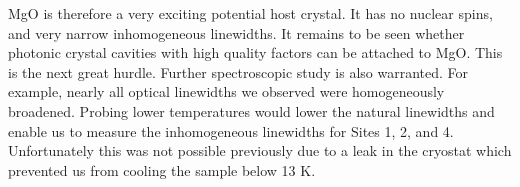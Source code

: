 \documentclass[12pt]{puthesis}
\begin{document}
MgO is therefore a very exciting potential host crystal. It has no nuclear spins, and very narrow inhomogeneous linewidths. It remains to be seen whether photonic crystal cavities with high quality factors can be attached to MgO. This is the next great hurdle. Further spectroscopic study is also warranted. For example, nearly all optical linewidths we observed were homogeneously broadened. Probing lower temperatures would lower the natural linewidths and enable us to measure the inhomogeneous linewidths for Sites 1, 2, and 4. Unfortunately this was not possible previously due to a leak in the cryostat which prevented us from cooling the sample below 13 K.


\newpage



\end{document}
